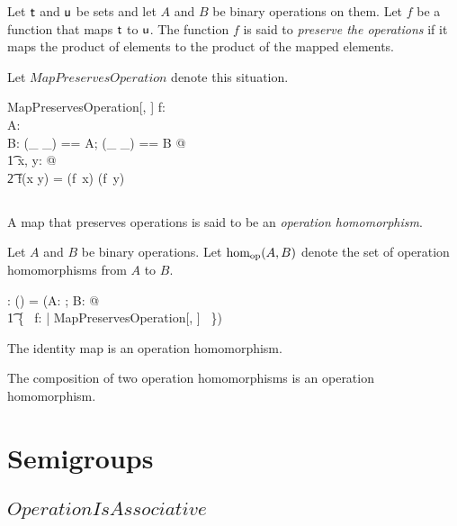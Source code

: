 \documentclass[11pt, oneside]{article}
\begin{document}
Let $\mathsf{t}$ and $\mathsf{u}$ be sets and let $A$ and $B$ be binary operations on them.
Let $f$ be a function that maps $\mathsf{t}$ to $\mathsf{u}$.
The function $f$ is said to {\em preserve the operations} if it maps the product of elements to 
the product of the mapped elements.

Let $MapPreservesOperation$ denote this situation.

\begin{schema}{MapPreservesOperation}[\genT, \genU]
f: \genT \fun \genU \\
A: \binop \genT \\
B: \binop \genU
\where
\LET (\_ \mulG \_) == A; (\_ \timesG \_) == B @ \\
\t1	\forall x, y: \genT @ \\
\t2		f(x \mulG y) = (f~x) \timesG (f~y)
\end{schema}

\subsection{}

A map that preserves operations is said to be an {\em operation homomorphism}.

Let $A$ and $B$ be binary operations. 
Let $\operatorname{hom_{op}}(A,B)$ denote the set of operation homomorphisms from $A$ to $B$.

\begin{gendef}[\genT, \genU]
\homBinOp: \binop \genT \cross \binop \genU  \fun \power (\genT \fun \genU)
\where
\homBinOp = (\lambda A: \binop \genT; B: \binop \genU @ \\
\t1	\{~ f: \genT \fun \genU | MapPreservesOperation[\genT, \genU] ~\})
\end{gendef}

\begin{remark}
The identity map is an operation homomorphism.
\end{remark}

\begin{remark}
The composition of two operation homomorphisms is an operation homomorphism.
\end{remark}

\section{Semigroups}

\subsection{$OperationIsAssociative$}
\end{document}
